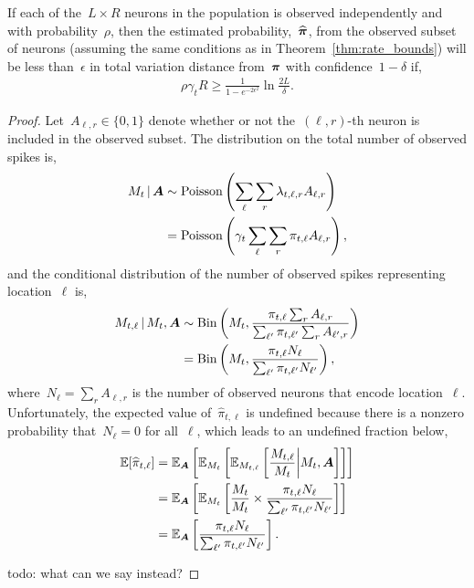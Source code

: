 \begin{corollary} 
  If each of the~$L \times R$ neurons in the population is observed 
  independently and with probability~$\rho$, then the estimated probability,~$\widehat{\boldsymbol{\pi}}$, 
  from the observed subset of neurons (assuming the same 
  conditions as in Theorem~\ref{thm:rate_bounds}) will be less 
  than~$\epsilon$ in total variation distance from~$\boldsymbol{\pi}$ 
  with confidence~$1-\delta$ if,
  \begin{align}
    \rho \gamma_t R \geq \frac{1}{1-e^{-2\epsilon^2}} \ln \frac{2L}{\delta}.
  \end{align}
\end{corollary}

\begin{proof}
  Let~$A_{\ell,r} \in \{0,1\}$ denote whether or not the~$(\ell,r)$-th neuron 
  is included in the observed subset. The distribution on the total number 
  of observed spikes is,
  \begin{align}
    M_t \,|\, \boldsymbol{A} &\sim \mathrm{Poisson} \left( \sum_\ell \sum_r \lambda_{t,\ell,r} A_{\ell, r} \right) \\
    &= \mathrm{Poisson} \left(\gamma_t \sum_\ell \sum_r \pi_{t, \ell} A_{\ell, r} \right),
  \end{align}
  and the conditional distribution of the number of observed spikes representing 
  location~$\ell$ is,
  \begin{align}
    M_{t, \ell} \,|\, M_t, \boldsymbol{A} 
    &\sim \mathrm{Bin} \left( M_t, 
      \frac{ \pi_{t, \ell} \sum_r A_{\ell, r}}
      { \sum_{\ell'} \pi_{t, \ell'}  \sum_r A_{\ell', r}} \right) \\
    &= \mathrm{Bin} \left( M_t,  
      \frac{ \pi_{t, \ell} N_\ell}
      { \sum_{\ell'} \pi_{t, \ell'} N_{\ell'}}  \right),
  \end{align} 
  where~$N_\ell=\sum_r A_{\ell, r}$ is the number of observed neurons that encode location~$\ell$.
  Unfortunately, the expected value of~$\widehat{\pi}_{t, \ell}$ is undefined because there 
  is a nonzero probability that~$N_\ell=0$ for all~$\ell$, which leads to an undefined 
  fraction below,
  \begin{align}
    \mathbb{E}[\widehat{\pi}_{t, \ell}] &= \mathbb{E}_{\boldsymbol{A}}\left[ \mathbb{E}_{M_t} \left[ \mathbb{E}_{M_{t, \ell}} \left[\frac{M_{t, \ell}}{M_t} \bigg| M_t, \boldsymbol{A} \right] \right] \right] \\
    &= \mathbb{E}_{\boldsymbol{A}}\left[ \mathbb{E}_{M_t} \left[ \frac{ M_t}{M_t} \times 
      \frac{  \pi_{t, \ell} N_{\ell}}
      {\sum_{\ell'} \pi_{t, \ell'} N_{\ell'}} \right] \right] \\
    &= \mathbb{E}_{\boldsymbol{A}}\left[ \frac{ \pi_{t, \ell} N_{\ell}}
      {\sum_{\ell'} \pi_{t, \ell'} N_{\ell'}} \right].
  \end{align}
  
  todo: what can we say instead?

\end{proof}

